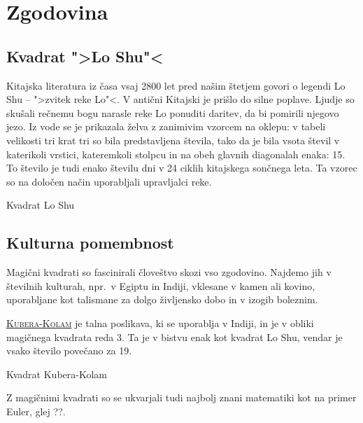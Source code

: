 \documentclass[a4paper,12pt]{article}
\theoremstyle{definition}
\theoremstyle{plain}
\newcommand{\pojem}[1]{
   \underline{\textsc{#1}}
}
\begin{document}

\section{Zgodovina}

\subsection{Kvadrat ">Lo Shu"<}

Kitajska literatura iz časa vsaj 2800 let pred našim štetjem govori o legendi
Lo Shu -- ">zvitek reke Lo"<. V antični Kitajski je prišlo do
silne poplave. Ljudje so skušali rečnemu bogu narasle reke Lo ponuditi daritev,
da bi pomirili njegovo jezo. Iz vode se je prikazala želva z zanimivim vzorcem
na oklepu: v tabeli velikosti tri krat tri so bila predstavljena števila, tako
da je bila vsota števil v katerikoli vrstici, kateremkoli stolpcu in na obeh
glavnih diagonalah enaka: 15. To število je tudi enako številu dni v 24 ciklih
kitajskega sončnega leta. Ta vzorec so na določen način uporabljali upravljalci
reke.

Kvadrat Lo Shu


\subsection{Kulturna pomembnost}

Magični kvadrati so fascinirali človeštvo skozi vso zgodovino. Najdemo jih
v številnih kulturah, npr.\ v Egiptu in Indiji, vklesane v kamen ali
kovino, uporabljane kot talismane za dolgo življensko dobo in v
izogib boleznim.

\pojem{Kubera-Kolam} je talna poslikava, ki se uporablja v Indiji, in je v
obliki magičnega kvadrata reda 3. Ta je v bistvu enak kot kvadrat
Lo Shu, vendar je vsako število povečano za 19.

Kvadrat Kubera-Kolam

Z magičnimi kvadrati so se ukvarjali tudi najbolj znani matematiki kot na
primer Euler, glej ??.
\end{document}
